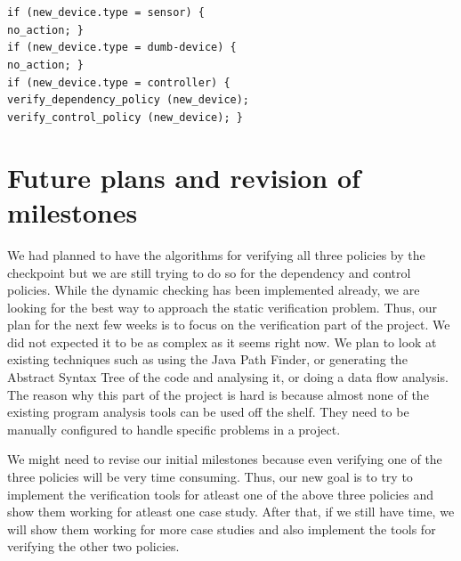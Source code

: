 \documentclass{article}
\begin{document}
\noindent \texttt{if (new\_device.type = sensor) \{ \\ \hspace*{1cm} no\_action; \} \\
if (new\_device.type = dumb-device) \{ \\ \hspace*{1cm} no\_action; \} \\
if (new\_device.type = controller) \{ \\ \hspace*{1cm} verify\_dependency\_policy (new\_device); \\ \hspace*{1.0cm} verify\_control\_policy (new\_device); \}}\\ 

\section{Future plans and revision of milestones}
We had planned to have the algorithms for verifying all three policies by the checkpoint but we are still trying to do so for the dependency and control policies. While the dynamic checking has been implemented already, we are looking for the best way to approach the static verification problem. Thus, our plan for the next few weeks is to focus on the verification part of the project. We did not expected it to be as complex as it seems right now. We plan to look at existing techniques such as using the Java Path Finder, or generating the Abstract Syntax Tree of the code and analysing it, or doing a data flow analysis. The reason why this part of the project is hard is because almost none of the existing program analysis tools can be used off the shelf. They need to be manually configured to handle specific problems in a project. 

We might need to revise our initial milestones because even verifying one of the three policies will be very time consuming.  Thus, our new goal is to try to implement the verification tools for atleast one of the above three policies and show them working for atleast one case study. After that, if we still have time, we will show them working for more case studies and also implement the tools for verifying the other two policies.
\end{document}
